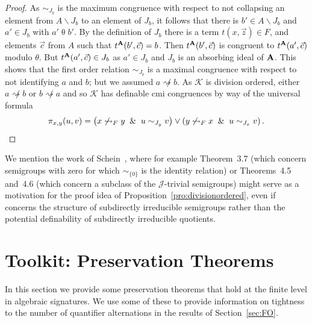 \documentclass[reqno]{amsart}
\theoremstyle{plain}
\theoremstyle{definition}
\newcommand{\divides}{\rightsquigarrow}
\begin{document}
\begin{proof}
As  $\sim_{J_b}$ is the maximum congruence with respect to not collapsing an element from $A\backslash J_b$ to an element of $J_b$, it follows that there is $b'\in A\backslash J_b$ and $a'\in J_b$ with $a'\mathrel{\theta}b'$.  
By the definition of $J_b$ there is a term $t(x,\vec{z})\in F$, and elements $\vec{c}$ from $A$ such that $t^{\bf A}(b',\vec{c})=b$.  Then $t^{\bf A}(b',\vec{c})$ is congruent to $t^{\bf A}(a',\vec{c})$ modulo $\theta$.  
But $t^{\bf A}(a',\vec{c})\in J_b$ as $a'\in J_b$ and $J_b$ is an absorbing ideal of ${\bf A}$.  
This shows that the first order relation $\sim_{J_b}$ is a maximal congruence with respect to not identifying $a$ and $b$; but we assumed $a\not\divides b$.  
As $\mathscr{K}$ is division ordered, either $a\not\divides b$ or $b\not\divides a$ and so $\mathscr{K}$ has definable cmi congruences by way of the universal formula 
\[
\pi_{x,y}(u,v)=\left(x\not\divides_{F}y\And u\sim_{J_y} v\right)\vee\left(y\not\divides_{F}x\And u\sim_{J_x} v\right).\qedhere
\]
\end{proof}
We mention the work of Schein~\cite{sch66}, where for example Theorem~3.7 (which concern semigroups with zero for which $\sim_{\{0\}}$ is the identity relation) or Theorems~4.5 and~4.6 (which concern a subclass of the $\mathscr{J}$-trivial semigroups) might serve as a motivation for the proof idea of Proposition~\ref{pro:divisionordered}, even if \cite{sch66} concerns the structure of subdirectly irreducible semigroups rather than the potential definability of subdirectly irreducible quotients.

\section{Toolkit: Preservation Theorems}\label{sec:preservation}
 In this section we provide some preservation theorems that hold at the finite level in algebraic signatures.  
We use some of these to provide information on tightness to the number of quantifier alternations in the results of Section~\ref{sec:FO}.
 
\end{document}
